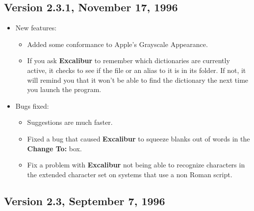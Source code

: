 ﻿\documentclass[11pt,titlepage]{article}
\newcommand{\ex}{\textbf{Excalibur}}
\begin{document}
\subsection{Version 2.3.1, November 17, 1996}

\begin{itemize}
\item New features:
  \begin{itemize}
  \item Added some conformance to Apple's Grayscale Appearance.

  \item If you ask \ex{} to remember which dictionaries are currently
    active, it checks to see if the file or an alias to it is in its
    folder.  If not, it will remind you that it won't be able to find
    the dictionary the next time you launch the program.
  \end{itemize}

\item Bugs fixed:

  \begin{itemize}
  \item Suggestions are much faster.

  \item Fixed a bug that caused \ex{} to squeeze blanks out of words
    in the \textbf{Change To:} box.

  \item Fix a problem with \ex{} not being able to recognize
    characters in the extended character set on systems that use a non
    Roman script.
  \end{itemize}
\end{itemize}

\subsection{Version 2.3, September 7, 1996}
\end{document}
